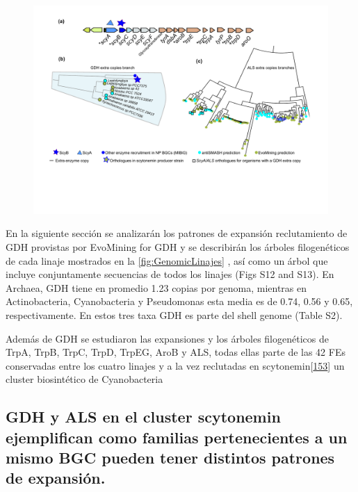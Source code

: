 \documentclass[12pt,twoside]{reedthesis}
\begin{document}
  \begin{figure}[h!tbp]
  \centering
  \includegraphics[angle = 0,scale = .6]{chapter2/FigurasPaper/Figure5.pdf}
  \caption[EvoMining aplicado a la rama de scytonemina]{\footnotesize{}}
  \label{fig:Scytonemin}
  \end{figure}
  
  En la siguiente sección se analizarán los patrones de expansión
  reclutamiento de GDH provistas por EvoMining for GDH y se describirán
  los árboles filogenéticos de cada linaje mostrados en la
  \autoref{fig:GenomicLinajes} , así como un árbol que incluye
  conjuntamente secuencias de todos los linajes (Figs S12 and S13). En
  Archaea, GDH tiene en promedio 1.23 copias por genoma, mientras en
  Actinobacteria, Cyanobacteria y Pseudomonas esta media es de 0.74, 0.56
  y 0.65, respectivamente. En estos tres taxa GDH es parte del shell
  genome (Table S2).
  
  Además de GDH se estudiaron las expansiones y los árboles filogenéticos
  de TrpA, TrpB, TrpC, TrpD, TrpEG, AroB y ALS, todas ellas parte de las
  42 FEs conservadas entre los cuatro linajes y a la vez reclutadas en
  scytonemin{[}\protect\hyperlink{ref-balskus_investigating_2008}{153}{]}
  un cluster biosintético de Cyanobacteria
  
  \subsection{GDH y ALS en el cluster scytonemin ejemplifican como
  familias pertenecientes a un mismo BGC pueden tener distintos patrones
  de
  expansión.}\label{gdh-y-als-en-el-cluster-scytonemin-ejemplifican-como-familias-pertenecientes-a-un-mismo-bgc-pueden-tener-distintos-patrones-de-expansion.}
  
\end{document}
